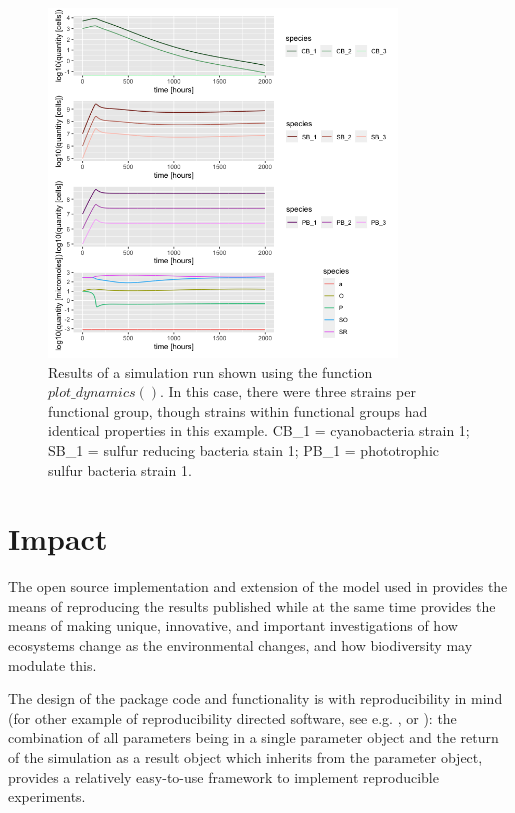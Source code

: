 \documentclass[]{elsarticle} %
\begin{document}
\begin{figure}

{\centering \includegraphics[width=350px]{figures/ug_three_strains_dynamics} 

}

\caption{Results of a simulation run shown using the function $plot\_dynamics()$. In this case, there were three strains per functional group, though strains within functional groups had identical properties in this example. CB\_1 = cyanobacteria strain 1; SB\_1 = sulfur reducing bacteria stain 1; PB\_1 = phototrophic sulfur bacteria strain 1.}\label{fig:plot-dynamics}
\end{figure}

\hypertarget{impact}{%
\section{Impact}\label{impact}}

The open source implementation and extension of the model used in \citet{Bush2017} provides the means of reproducing the results published while at the same time provides the means of making unique, innovative, and important investigations of how ecosystems change as the environmental changes, and how biodiversity may modulate this.

The design of the package code and functionality is with reproducibility in mind (for other example of reproducibility directed software, see e.g. \citet{Correndo2023}, \citet{Spillner2022} or \citet{Fox2020}): the combination of all parameters being in a single parameter object and the return of the simulation as a result object which inherits from the parameter object, provides a relatively easy-to-use framework to implement reproducible experiments.
\end{document}

